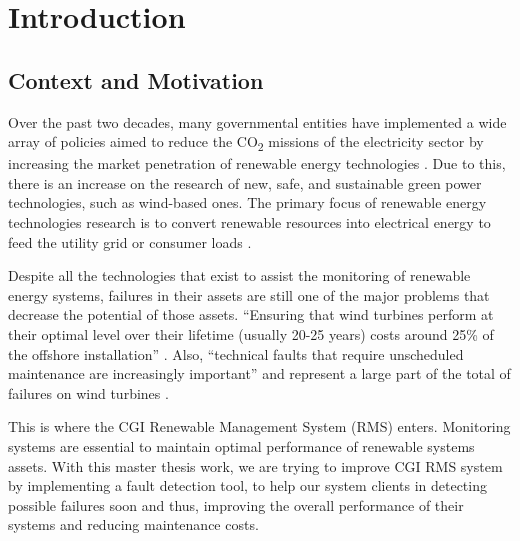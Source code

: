 


\chapter{Introduction}
\label{cha:introduction}

\section{Context and Motivation} 
\label{sub:if_you_use_this_template} 

Over the past two decades, many governmental entities have implemented a wide array of policies aimed to reduce the CO\textsubscript{2} missions of the electricity sector by increasing the market penetration of renewable energy technologies \cite{OLD_3_GENERAL}. Due to this, there is an increase on the research of new, safe, and sustainable green power technologies, such as wind-based ones. The primary focus of renewable energy technologies research is to convert renewable resources into electrical energy to feed the utility grid or consumer loads \cite{OLD_1_SOLAR}.

Despite all the technologies that exist to assist the monitoring of renewable energy systems, failures in their assets are still one of the major problems that decrease the potential of those assets. “Ensuring that wind turbines perform at their optimal level over their lifetime (usually 20-25 years) costs around 25\% of the offshore installation” \cite{OLD_15_WIND}. Also, “technical faults that require unscheduled maintenance are increasingly important” and represent a large part of the total of failures on wind turbines \cite{OLD_18_WIND}.

This is where the CGI Renewable Management System (RMS) enters. Monitoring systems are essential to maintain optimal performance of renewable systems assets. With this master thesis work, we are trying to improve CGI RMS system by implementing a fault detection tool, to help our system clients in detecting possible failures soon and thus, improving the overall performance of their systems and reducing maintenance costs.


